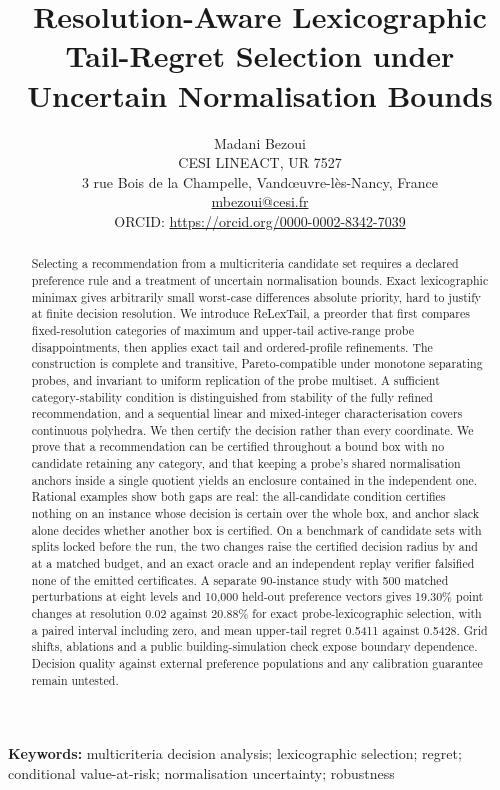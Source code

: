 \documentclass[10pt,a4paper]{article}
\title{Resolution-Aware Lexicographic Tail-Regret Selection under Uncertain Normalisation Bounds}
\author{Madani Bezoui\\[3pt]\small CESI LINEACT, UR 7527\\\small 3 rue Bois de la Champelle, Vand\oe uvre-l\`es-Nancy, France\\\small\href{mailto:mbezoui@cesi.fr}{mbezoui@cesi.fr}\\\small ORCID: \url{https://orcid.org/0000-0002-8342-7039}}
\date{}
\begin{document}
\maketitle
\begin{abstract}
Selecting a recommendation from a multicriteria candidate set requires a declared preference rule and a treatment of uncertain normalisation bounds. Exact lexicographic minimax gives arbitrarily small worst-case differences absolute priority, hard to justify at finite decision resolution. We introduce ReLexTail, a preorder that first compares fixed-resolution categories of maximum and upper-tail active-range probe disappointments, then applies exact tail and ordered-profile refinements. The construction is complete and transitive, Pareto-compatible under monotone separating probes, and invariant to uniform replication of the probe multiset. A sufficient category-stability condition is distinguished from stability of the fully refined recommendation, and a sequential linear and mixed-integer characterisation covers continuous polyhedra. We then certify the decision rather than every coordinate. We prove that a recommendation can be certified throughout a bound box with no candidate retaining any category, and that keeping a probe's shared normalisation anchors inside a single quotient yields an enclosure contained in the independent one. Rational examples show both gaps are real: the all-candidate condition certifies nothing on an instance whose decision is certain over the whole box, and anchor slack alone decides whether another box is certified. On a benchmark of \crxInstances{} candidate sets with splits locked before the run, the two changes raise the certified decision radius by \crxPOneMean{} and \crxPTwoMean{} at a matched budget, and an exact oracle and an independent replay verifier falsified none of the emitted certificates. A separate 90-instance study with 500 matched perturbations at eight levels and 10,000 held-out preference vectors gives 19.30\% point changes at resolution 0.02 against 20.88\% for exact probe-lexicographic selection, with a paired interval including zero, and mean upper-tail regret 0.5411 against 0.5428. Grid shifts, ablations and a public building-simulation check expose boundary dependence. Decision quality against external preference populations and any calibration guarantee remain untested.
\end{abstract}
\noindent\textbf{Keywords:} multicriteria decision analysis; lexicographic selection; regret; conditional value-at-risk; normalisation uncertainty; robustness








\FloatBarrier


\clearpage
\end{document}
